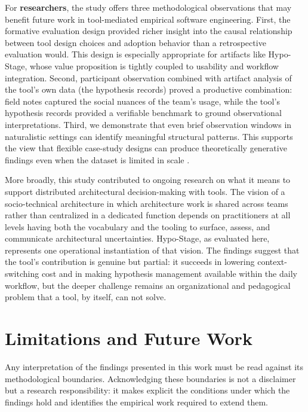 For \textbf{researchers}, the study offers three methodological observations that may
benefit future work in tool-mediated empirical software engineering. First, the
formative evaluation design provided richer insight into the causal relationship between tool design choices and adoption
behavior than a retrospective evaluation would. This design is especially appropriate
for artifacts like Hypo-Stage, whose value proposition is tightly coupled to usability
and workflow integration. Second, participant observation combined with artifact
analysis of the tool's own data (the hypothesis records) proved a productive combination:
field notes captured the social nuances of the team's usage, while the tool’s hypothesis records provided a 
verifiable benchmark to ground observational interpretations. Third, we demonstrate that even brief observation windows 
in naturalistic settings can identify meaningful structural patterns. This supports the view that flexible case-study designs can produce theoretically
generative findings even when the dataset is limited in scale \citep{robson2016}.

More broadly, this study contributed to ongoing research on what it means to
support distributed architectural decision-making with tools. The vision of a
socio-technical architecture \citep{infoq2024trends, infoq2025empowering, infoq2025decentralized} in which
architecture work is shared across teams rather than centralized in a dedicated function
depends on practitioners at all levels having both the vocabulary and the tooling to
surface, assess, and communicate architectural uncertainties. Hypo-Stage, as evaluated
here, represents one operational instantiation of that vision. The findings suggest
that the tool's contribution is genuine but partial: it succeeds in lowering
context-switching cost and in making hypothesis management available within the daily
workflow, but the deeper challenge remains an organizational and 
pedagogical problem that a tool, by itself, can not solve.

\section{Limitations and Future Work}
\label{sec:future-work}
\label{sec:conclusion-limitations}

Any interpretation of the findings presented in this work must be read against
its methodological boundaries. Acknowledging these boundaries is not a disclaimer but
a research responsibility: it makes explicit the conditions under which the findings hold
and identifies the empirical work required to extend them.

